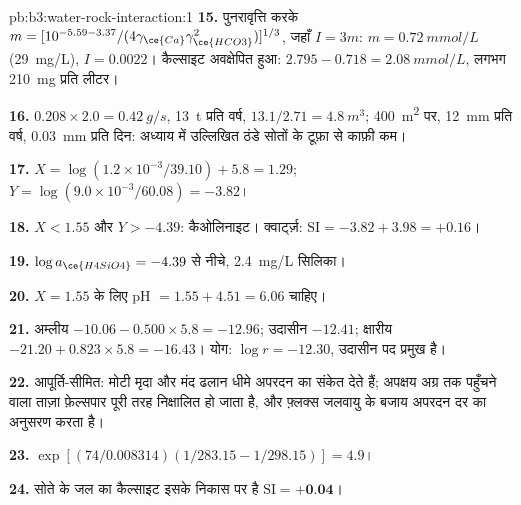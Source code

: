\begin{solution}{pb:b3:water-rock-interaction:1}
\textbf{15.} पुनरावृत्ति करके $m = [10^{-5.59 - 3.37}/(4\gamma_{\ce{Ca}}
\gamma_{\ce{HCO3}}^2)]^{1/3}$, जहाँ $I = 3m$: $m = \qty{0.72}{mmol/L}$
(\qty{29}{mg/L}), $I = 0.0022$। कैल्साइट अवक्षेपित हुआ: $2.795 - 0.718 =
\qty{2.08}{mmol/L}$, लगभग \qty{210}{mg} प्रति लीटर।

\textbf{16.} $0.208\times2.0 = \qty{0.42}{g/s}$, \qty{13}{t} प्रति वर्ष,
$13.1/2.71 = \qty{4.8}{m^3}$; \qty{400}{m^2} पर, \qty{12}{mm} प्रति वर्ष,
\qty{0.03}{mm} प्रति दिन: अध्याय में उल्लिखित ठंडे सोतों के टूफ़ा से काफ़ी कम।

\textbf{17.} $X = \log(1.2\times10^{-3}/39.10) + 5.8 = 1.29$; $Y =
\log(9.0\times10^{-3}/60.08) = -3.82$।

\textbf{18.} $X < 1.55$ और $Y > -4.39$: कैओलिनाइट। क्वार्ट्ज़: $\mathrm{SI} =
-3.82 + 3.98 = +0.16$।

\textbf{19.} $\log a_{\ce{H4SiO4}} = -4.39$ से नीचे, \qty{2.4}{mg/L}
सिलिका।

\textbf{20.} $X = 1.55$ के लिए pH $= 1.55 + 4.51 = 6.06$ चाहिए।

\textbf{21.} अम्लीय $-10.06 - 0.500\times5.8 = -12.96$; उदासीन $-12.41$; क्षारीय
$-21.20 + 0.823\times5.8 = -16.43$। योग: $\log r = -12.30$, उदासीन पद
प्रमुख है।

\textbf{22.} आपूर्ति-सीमित: मोटी मृदा और मंद ढलान धीमे अपरदन का संकेत देते हैं;
अपक्षय अग्र तक पहुँचने वाला ताज़ा फ़ेल्सपार पूरी तरह निक्षालित हो जाता है, और
फ़्लक्स जलवायु के बजाय अपरदन दर का अनुसरण करता है।

\textbf{23.} $\exp[(74/0.008314)(1/283.15 - 1/298.15)] = 4.9$।

\textbf{24.} सोते के जल का कैल्साइट  इसके निकास पर
है $\mathrm{SI} = \textbf{+0.04}$।
\end{solution}
